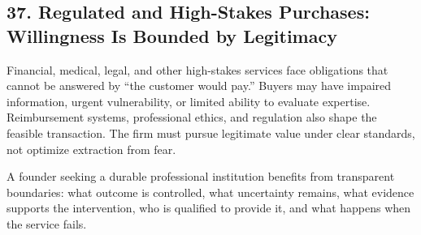 \subsection*{37. Regulated and High-Stakes Purchases: Willingness Is Bounded by Legitimacy}

Financial, medical, legal, and other high-stakes services face obligations that cannot be answered by ``the customer would pay.'' Buyers may have impaired information, urgent vulnerability, or limited ability to evaluate expertise. Reimbursement systems, professional ethics, and regulation also shape the feasible transaction. The firm must pursue legitimate value under clear standards, not optimize extraction from fear.

A founder seeking a durable professional institution benefits from transparent boundaries: what outcome is controlled, what uncertainty remains, what evidence supports the intervention, who is qualified to provide it, and what happens when the service fails.
